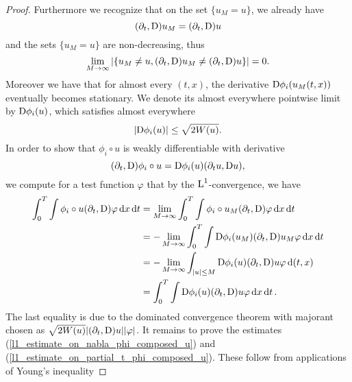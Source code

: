 \begin{proof}
	Furthermore we recognize that on the set $ \{ u_{M } = u \} $, we already have
	\begin{equation*}
		( \partial_{ t } , \mathrm{D} ) u_{ M }
		=
		( \partial_{ t } , \mathrm{D} ) u
	\end{equation*}
	and the sets $ \{ u_{ M } = u \} $ are non-decreasing, thus
	\begin{equation*}
		\lim_{ M \to \infty }
		\abs{
			\left\{
				u_{ M } \neq u, ( \partial_{ t } , \mathrm{D} ) u_{ M } \neq ( 
				\partial_{ t }, \mathrm{D} ) u 
			\right\}
		}
		=
		0.
	\end{equation*}
	Moreover we have that for almost every $ ( t, x ) $, the derivative $ \mathrm{D} 
	\phi_{ i } ( u_{ M } ( t , x ) ) $ eventually becomes stationary. We denote 
	its almost everywhere pointwise limit by $ \mathrm{D} \phi_{ i } ( u ) $, which 
	satisfies almost everywhere
	\begin{equation*}
		\abs{
			\mathrm{D} \phi_{ i } ( u ) 
		}
		\leq
		\sqrt{ 2 W ( u ) }.
	\end{equation*}
	In order to show that $ \phi_{ i } \circ u $ is weakly differentiable with derivative 
	\begin{equation*}
		( \partial_{ t } , \mathrm{D} ) \phi_{ i } \circ u
		=
		\mathrm{D} \phi_{ i } ( u ) ( \partial_{ t } u, \mathrm{D} u ),
	\end{equation*}
	we compute for a test function $ \varphi $ that by the $ \operatorname{L}^{ 1 } 
	$-convergence, we have
	\begin{align*}
		\int_{ 0 }^{ T }
		\int
			\phi_{ i } \circ u
			( \partial_{ t } , \mathrm{D} ) \varphi
		\dd{ x}
		\dd{ t }
		&
		=
		\lim_{ M \to \infty }
			\int_{0 }^{ T }
				\int
					\phi_{ i } \circ u_{ M }
					( \partial_{ t } , \mathrm{D}) \varphi
				\dd{ x }
			\dd{ t }
		\\
		& =
		- \lim_{ M \to \infty }
			\int_{ 0 }^{ T }
			\int
				\mathrm{D} \phi_{ i } ( u_{ M } )
				( \partial_{ t } , \mathrm{D} ) u_{ M }
				\varphi
			\dd{ x }
		\dd{ t }
		\\
		& =
		- \lim_{ M \to \infty }
			\int_{ \abs{ u } \leq M }
				\mathrm{D} \phi_{ i } ( u ) 
				( \partial_{ t } , \mathrm{D} ) u
				\varphi
			\dd{ ( t, x ) }
		\\
		& =
		\int_{ 0 }^{ T }
			\int
				\mathrm{D} \phi_{ i } ( u ) 
				( \partial_{ t } , \mathrm{D} ) u
				\varphi
			\dd{ x }
		\dd{ t }.
	\end{align*}
	The last equality is due to the dominated convergence theorem with 
	majorant chosen as $ \sqrt{ 2 W ( u ) } \abs{ ( \partial_{ t } , 
	\mathrm{D} ) u } \abs{ \varphi } $.
	It remains to prove the estimates (\ref{l1_estimate_on_nabla_phi_composed_u}) and (\ref{l1_estimate_on_partial_t_phi_composed_u}). These follow from applications of Young's inequality

\end{proof}
